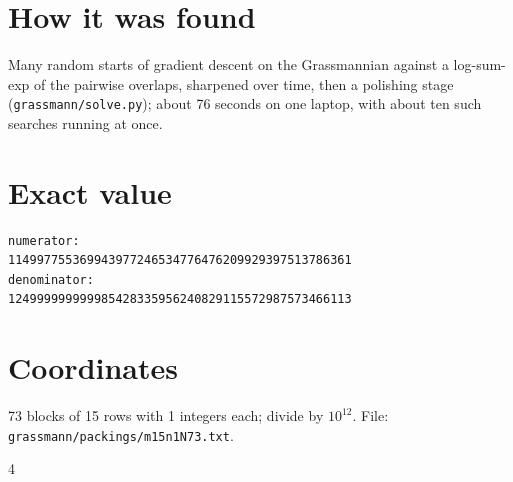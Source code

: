 \documentclass[11pt,a4paper]{article}
\begin{document}
\section{How it was found}
Many random starts of gradient descent on the Grassmannian against a log-sum-exp of the pairwise overlaps, sharpened over time, then a polishing stage (\texttt{grassmann/solve.py}); about 76 seconds on one laptop, with about ten such searches running at once.


\appendix
\section{Exact value}
{\small
\begin{verbatim}
numerator:
114997755369943977246534776476209929397513786361
denominator:
124999999999985428335956240829115572987573466113
\end{verbatim}}

\section{Coordinates}
73 blocks of 15 rows with 1 integers each; divide by $10^{12}$. File: \texttt{grassmann/packings/m15n1N73.txt}.
{\tiny
\begin{multicols}{4}
\end{multicols}}
\end{document}

